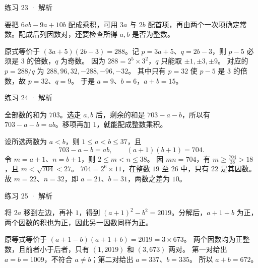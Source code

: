 

\begin{solution}[before skip=4pt plus 1pt,after skip=4pt plus 1pt,top=6pt,bottom=6pt]{练习 23 · 解析}

\think 要把 $6ab-9a+10b$ 配成乘积，可用 $3a$ 与 $2b$ 配首项，再由两个一次项确定常数。配成后列因数对，还要检查所得 $a,b$ 是否为整数。

\solve 原式等价于 $(3a+5)(2b-3)=288$。记 $p=3a+5$、$q=2b-3$，则 $p-5$ 必须是 $3$ 的倍数，$q$ 为奇数。
因为 $288=2^5\times3^2$，$q$ 只能取 $\pm1,\pm3,\pm9$。
对应的 $p=288/q$ 为 $288,96,32,-288,-96,-32$。
其中只有 $p=32$ 使 $p-5$ 是 $3$ 的倍数，故 $p=32$、$q=9$。
于是 $a=9$、$b=6$，$a+b=15$。


\end{solution}


\begin{solution}[before skip=4pt plus 1pt,after skip=4pt plus 1pt,top=6pt,bottom=6pt]{练习 24 · 解析}

\think 全部数的和为 $703$。选走 $a,b$ 后，剩余的和是 $703-a-b$，所以有 $703-a-b=ab$。移项再加 $1$，就能配成整数乘积。

\solve 设所选两数为 $a<b$，则 $1\le a<b\le37$，且
\[703-a-b=ab,\qquad (a+1)(b+1)=704.\]
令 $m=a+1$、$n=b+1$，则 $2\le m<n\le38$。
因 $mn=704$，有 $m\ge\frac{704}{38}>18$，且 $m<\sqrt{704}<27$。
$704=2^6\times11$，在整数 $19$ 至 $26$ 中，只有 $22$ 是其因数。
故 $m=22$、$n=32$，即 $a=21$、$b=31$，两数之差为 $10$。


\end{solution}


\begin{solution}[before skip=4pt plus 1pt,after skip=4pt plus 1pt,top=6pt,bottom=6pt]{练习 25 · 解析}

\think 将 $2a$ 移到左边，再补 $1$，得到 $(a+1)^2-b^2=2019$。分解后，$a+1+b$ 为正，两个因数的积也为正，因此另一因数同样为正。

\solve 原等式等价于 $(a+1-b)(a+1+b)=2019=3\times673$。
两个因数均为正整数，且前者小于后者，只有 $(1,2019)$ 和 $(3,673)$ 两对。
第一对给出 $a=b=1009$，不符合 $a\ne b$；第二对给出 $a=337$、$b=335$。
所以 $a+b=672$。


\end{solution}

